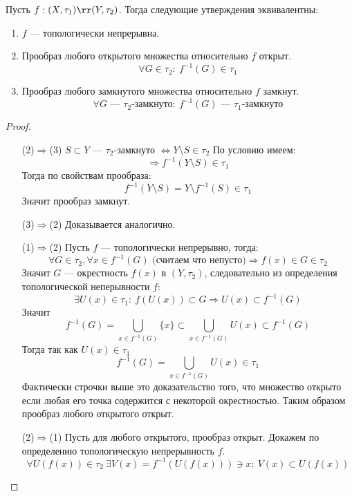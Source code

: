 \begin{theorem}
	\label{th:ctc}
	Пусть $f: (X, \tau_1)\rr(Y,\tau_2)$. Тогда следующие утверждения эквивалентны:
	\begin{enumerate}
		\item $f$ --- топологически непрерывна. 
		\item Прообраз любого открытого множества относительно $f$ открыт.
		$$
		\forall G \in \tau_2: \ f^{-1}(G) \in \tau_1
		$$ 
		\item Прообраз любого замкнутого множества относительно $f$ замкнут. 
		$$
		\forall G \text{ --- $\tau_2$-замкнуто}: \ f^{-1}(G) \text{ --- $\tau_1$-замкнуто}
		$$
	\end{enumerate} 
	
\end{theorem}
\begin{proof}
	\hfill
	\begin{enumerate}
		\item[(2)$\Rightarrow$(3)] $S \subset Y$ --- $\tau_2$-замкнуто $\Leftrightarrow Y \setminus S \in \tau_2$ По условию имеем:
		$$\Rightarrow f^{-1}(Y\setminus S) \in \tau_1$$
		Тогда по свойствам прообраза:
		$$
		f^{-1}(Y\setminus S) = Y\setminus f^{-1}(S) \in \tau_1
		$$
		Значит прообраз замкнут. 
		\item[(3)$\Rightarrow$(2)] Доказывается аналогично.
		\item [(1)$\Rightarrow$(2)] Пусть $f$ --- топологически непрерывно, тогда: 
		$$
		\forall G \in \tau_2, \forall x \in f^{-1}(G) \text{ (считаем что непусто)} \Rightarrow f(x) \in G \in \tau_2
		$$
		Значит $G$ --- окрестность $f(x)$ в $(Y, \tau_2)$, следовательно из определения топологической неперывности $f$:
		$$
		\exists U(x) \in \tau_1: \ f(U(x)) \subset G \Rightarrow U(x) \subset f^{-1}(G)
		$$
		Значит 
		$$
		f^{-1}(G)= \bigcup_{x \in f^{-1}(G)} \{x\} \subset \bigcup_{x \in f^{-1}(G)} U(x) \subset f^{-1}(G)
		$$
		Тогда так как $U(x) \in \tau_1$
		$$
		f^{-1}(G) = \bigcup_{x \in f^{-1}(G)} U(x) \in \tau_1
		$$
		Фактически строчки выше это доказательство того, что множество открыто если любая его точка содержится с некоторой окрестностью. Таким образом прообраз любого открытого открыт. 
		\item[(2)$\Rightarrow$(1)] Пусть для любого открытого, прообраз открыт. Докажем по определению топологическую непрерывность $f$. 
		$$
		\forall U(f(x)) \in \tau_2 \ \exists V(x) = f^{-1}(U(f(x))) \ni x: \ V(x) \subset U(f(x))
		$$
	\end{enumerate}
\end{proof}

